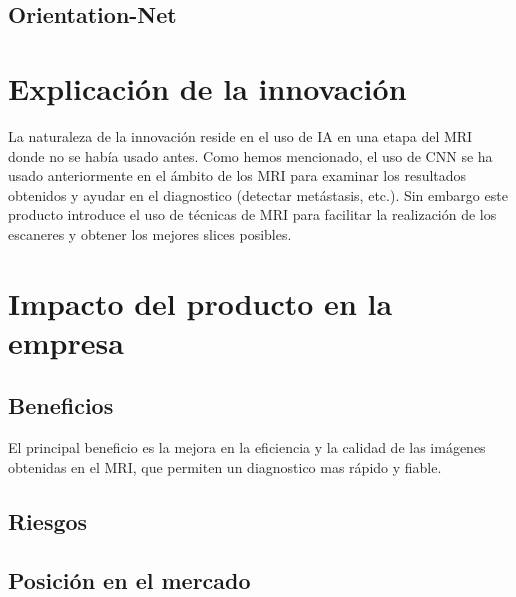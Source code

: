     \subsection{Orientation-Net}
    
    
\section{Explicación de la innovación}
\cite{noauthor_intelligent_nodate}
\cite{noauthor_magnetic_nodate} 

La naturaleza de la innovación reside en el uso de IA en una etapa del MRI donde no se había usado antes.
Como hemos mencionado, el uso de CNN se ha usado anteriormente en el ámbito de los MRI para examinar
los resultados obtenidos y ayudar en el diagnostico (detectar metástasis, etc.). Sin embargo
este producto introduce el uso de técnicas de MRI para facilitar la realización de los escaneres y
obtener los mejores slices posibles.

\section{Impacto del producto en la empresa}

\cite{noauthor_intelligent_nodate}
\cite{noauthor_new_nodate}

    \subsection{Beneficios}
    
    El principal beneficio es la mejora en la eficiencia y la calidad de las imágenes obtenidas en el
    MRI, que permiten un diagnostico mas rápido y fiable.
    
    \subsection{Riesgos}
    
    \subsection{Posición en el mercado}
    

